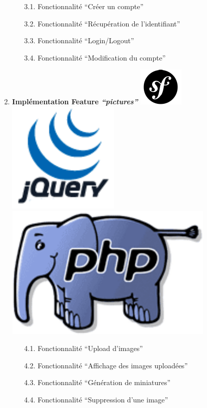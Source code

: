 \documentclass{article}
\begin{document}
\begin{sffamily}
\begin{enumerate}
	\begin{enumerate}
		\item[3.1.] Fonctionnalité ``Créer un compte''
		\item[3.2.] Fonctionnalité ``Récupération de l'identifiant''
		\item[3.3.] Fonctionnalité ``Login/Logout''	
		\item[3.4.] Fonctionnalité ``Modification du compte''	
	\end{enumerate}
\item \textbf{Implémentation Feature \textit{``pictures''}} \includegraphics[scale=0.5]{symfony.pdf}\includegraphics[scale=0.2]{jquery.pdf}\includegraphics[scale=0.15]{php.pdf}
	\begin{enumerate}
		\item[4.1.] Fonctionnalité ``Upload d'images''
		\item[4.2.] Fonctionnalité ``Affichage des images uploadées''
		\item[4.3.] Fonctionnalité ``Génération de miniatures''
		\item[4.4.] Fonctionnalité ``Suppression d'une image''
	\end{enumerate}

\end{enumerate}
\end{sffamily}
\end{document}
